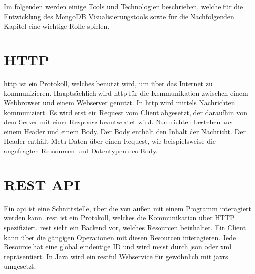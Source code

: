 Im folgenden werden einige Tools und Technologien beschrieben, welche für die Entwicklung des MongoDB Visualisierungstools sowie für die Nachfolgenden Kapitel eine wichtige Rolle spielen.

\section{HTTP}
\label{sec:http}

\ac{http} ist ein Protokoll, welches benutzt wird, um über das Internet zu kommunizieren.
Hauptsächlich wird \ac{http} für die Kommunikation zwischen einem Webbrowser und einem Webserver genutzt.
In \ac{http} wird mittels Nachrichten kommuniziert.
Es wird erst ein Request vom Client abgesetzt, der daraufhin von dem Server mit einer Response beantwortet wird.
Nachrichten bestehen aus einem Header und einem Body.
Der Body enthält den Inhalt der Nachricht.
Der Header enthält Meta-Daten über einen Request, wie beispielsweise die angefragten Ressourcen und Datentypen des Body.

\section{REST API}
\label{sec:rest}

Ein \ac{api} ist eine Schnittstelle, über die von außen mit einem Programm interagiert werden kann.
\ac{rest} ist ein Protokoll, welches die Kommunikation über HTTP spezifiziert.
\ac{rest} sieht ein Backend vor, welches Resourcen beinhaltet.
Ein Client kann über die gängigen  Operationen mit diesen Resourcen interagieren.
Jede Resource hat eine global eindeutige ID und wird meist durch \ac{json} oder \ac{xml} repräsentiert.
In Java wird ein \ac{rest}ful Webservice für gewöhnlich mit \ac{jaxrs} umgesetzt.
~\autocite{schiesser:javaEE7}


